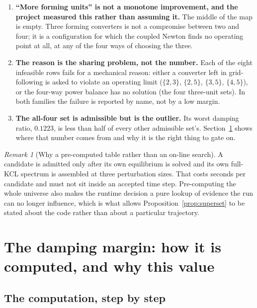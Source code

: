 \documentclass[12pt,a4paper]{article}
\theoremstyle{remark}
\newtheorem{remark}{Remark}
\begin{document}
\begin{enumerate}[leftmargin=1.6em,itemsep=2.5pt]
\item \textbf{``More forming units'' is not a monotone improvement, and the
      project measured this rather than assuming it.} The middle of the map is
      empty. Three forming converters is not a compromise between two and four;
      it is a configuration for which the coupled Newton finds no operating
      point at all, at any of the four ways of choosing the three.
\item \textbf{The reason is the sharing problem, not the number.} Each of the
      eight infeasible rows fails for a mechanical reason: either a converter
      left in grid-following is asked to violate an operating limit
      ($\{2,3\}$, $\{2,5\}$, $\{3,5\}$, $\{4,5\}$), or the four-way power balance
      has no solution (the four three-unit sets). In both families the failure is
      reported by name, not by a low margin.
\item \textbf{The all-four set is admissible but is the outlier.} Its worst
      damping ratio, $0.1223$, is less than half of every other admissible set's.
      Section~\ref{sec:damping} shows where that number comes from and why it is
      the right thing to gate on.
\end{enumerate}

\begin{remark}[Why a pre-computed table rather than an on-line search]
A candidate is admitted only after its own equilibrium is solved and its own
full-KCL spectrum is assembled at three perturbation sizes. That costs seconds
per candidate and must not sit inside an accepted time step. Pre-computing the
whole universe also makes the runtime decision a pure lookup of evidence the run
can no longer influence, which is what allows Proposition~\ref{prop:superset} to
be stated about the code rather than about a particular trajectory.
\end{remark}

\section{The damping margin: how it is computed, and why this value}
\label{sec:damping}

\subsection{The computation, step by step}
\end{document}
